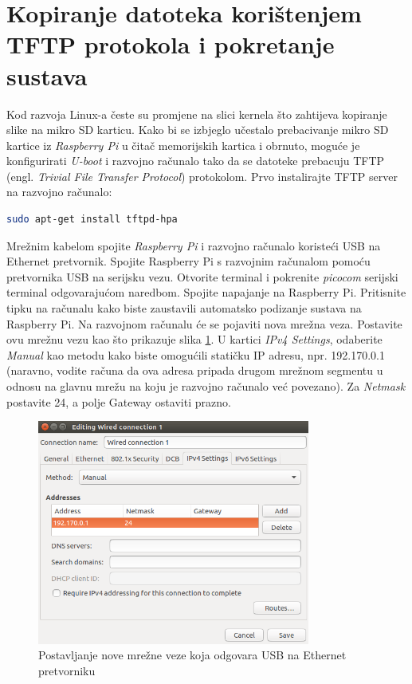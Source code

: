 \documentclass[11pt]{article}
\begin{document}
\section{Kopiranje datoteka korištenjem TFTP protokola i pokretanje sustava}
Kod razvoja Linux-a česte su promjene na slici kernela što zahtijeva kopiranje
 slike na mikro SD karticu. Kako bi se izbjeglo učestalo prebacivanje mikro SD
 kartice iz \textit{Raspberry Pi} u čitač memorijskih kartica i obrnuto, moguće
 je konfigurirati \textit{U-boot} i razvojno računalo tako da se datoteke
 prebacuju TFTP (engl. \textit{Trivial File Transfer Protocol}) protokolom.
 Prvo instalirajte TFTP server na razvojno računalo:
\begin{lstlisting}[language=bash]
sudo apt-get install tftpd-hpa
\end{lstlisting}
Mrežnim kabelom spojite \textit{Raspberry Pi} i razvojno računalo koristeći
 USB na Ethernet pretvornik. Spojite Raspberry Pi s razvojnim računalom pomoću
 pretvornika USB na serijsku vezu. Otvorite terminal i pokrenite
 \textit{picocom} serijski terminal odgovarajućom naredbom.
 Spojite napajanje na Raspberry Pi. Pritisnite tipku na računalu kako biste
 zaustavili automatsko podizanje sustava na Raspberry Pi. Na razvojnom računalu
 će se pojaviti nova mrežna veza. Postavite ovu mrežnu vezu kao što prikazuje
 slika \ref{fig:ubuntu-ethernet}. U kartici \textit{IPv4 Settings}, odaberite
 \textit{Manual} kao metodu kako biste omogućili statičku IP adresu, npr.
 192.170.0.1 (naravno, vodite računa da ova adresa pripada drugom mrežnom
 segmentu u odnosu na glavnu mrežu na koju je razvojno računalo već povezano).
 Za \textit{Netmask} postavite 24, a polje Gateway ostaviti prazno.
\begin{figure}[h!]
\centering
\includegraphics[width=0.8\textwidth]{ubuntu-ethernet.png}
\captionsetup{justification=centering}
\caption{Postavljanje nove mrežne veze koja odgovara USB na Ethernet
 pretvorniku}
\label{fig:ubuntu-ethernet}
\end{figure}
\end{document}
